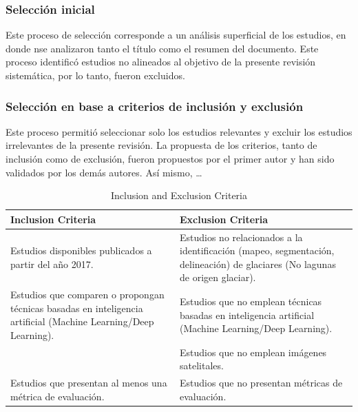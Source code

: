 \documentclass{article}
\begin{document}
\subsubsection{Selección inicial}

Este proceso de selección corresponde a un análisis superficial de los estudios, en donde nse analizaron tanto el título como el resumen del documento.
Este proceso identificó estudios no alineados al objetivo de la presente revisión sistemática, por lo tanto, fueron excluidos.

\subsubsection{Selección en base a criterios de inclusión y exclusión}

Este proceso permitió seleccionar solo los estudios relevantes y excluir los estudios irrelevantes de la presente revisión. La propuesta de los criterios, tanto de inclusión como de exclusión, fueron propuestos por el primer autor y han sido validados por los demás autores. Así mismo, …

\begin{table}[H]
    \centering
    \caption{Inclusion and Exclusion Criteria}
    \hspace{1cm}
    \label{tab:inclusion_exclusion_criteria}
    \begin{tabularx}{\textwidth}{XX}
        \hline
        \textbf{Inclusion Criteria}                                                                                     & \textbf{Exclusion Criteria}                                                                                                  \\ \hline
        Estudios disponibles publicados a partir del año 2017.                                                          & Estudios no relacionados a la identificación (mapeo, segmentación, delineación) de glaciares (No lagunas de origen glaciar). \\
        Estudios que comparen o propongan técnicas basadas en inteligencia artificial (Machine Learning/Deep Learning). & Estudios que no emplean técnicas basadas en inteligencia artificial (Machine Learning/Deep Learning).                        \\
                                                                                                                        & Estudios que no emplean imágenes satelitales.                                                                                \\
        Estudios que presentan al menos una métrica de evaluación.                                                      & Estudios que no presentan métricas de evaluación.                                                                            \\ \hline
    \end{tabularx}
\end{table}
\end{document}
